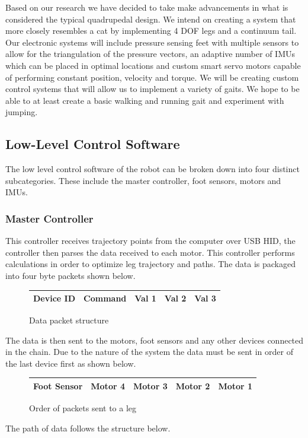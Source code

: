         



Based on our research we have decided to take make advancements in what is considered the typical quadrupedal design. We intend on creating a system that more closely resembles a cat by implementing 4 DOF legs and a continuum tail. Our electronic systems will include pressure sensing feet with multiple sensors to allow for the triangulation of the pressure vectors, an adaptive number of IMUs which can be placed in optimal locations and custom smart servo motors capable of performing constant position, velocity and torque. We will be creating custom control systems that will allow us to implement a variety of gaits. We hope to be able to at least create a basic walking and running gait and experiment with jumping.


\subsection{Low-Level Control Software} 
    The low level control software of the robot can be broken down into four distinct subcategories. These include the master controller, foot sensors, motors and IMUs. 
        \subsubsection{Master Controller}
        This controller receives trajectory points from the computer over USB HID, the controller then parses the data received to each motor. This controller performs calculations in order to optimize leg trajectory and paths. The data is packaged into four byte packets shown below.  
        \begin{figure}[H]
        \centering
        \begin{tabular}{|c|c|c|c|c|}
        \hline
        Device ID& Command & Val 1 & Val 2 & Val 3\\
        \hline
        \end{tabular}
        \caption{Data packet structure}
        \label{fig:DataPacketStructure}
        \end{figure}
        The data is then sent to the motors, foot sensors and any other devices connected in the chain. Due to the nature of the system the data must be sent in order of the last device first as shown below. 
        \begin{figure}[H]
        \centering
        \begin{tabular}{|c|c|c|c|c|}
        \hline
            Foot Sensor & Motor 4 & Motor 3 & Motor 2 & Motor 1  \\
            \hline
        \end{tabular}
        \caption{Order of packets sent to a leg}
        \label{fig:PacketOrder}
        \end{figure}
        The path of data follows the structure below.

